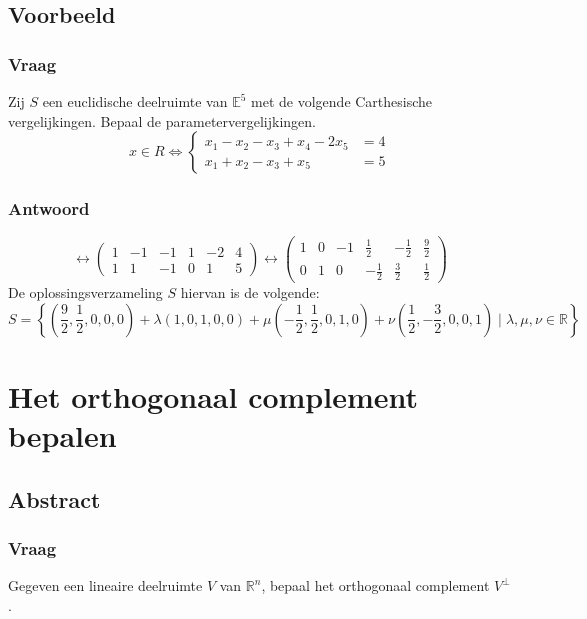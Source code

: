 \documentclass[main.tex]{subfiles}
\begin{document}
\subsection*{Voorbeeld}
\subsubsection*{Vraag}
\begin{center}
  Zij $S$ een euclidische deelruimte van $\mathbb{E}^{5}$ met de
  volgende Carthesische vergelijkingen.  Bepaal de
  parametervergelijkingen.
  \[
  x \in R \Leftrightarrow
  \left\{
    \begin{array}{cc}
      x_{1}-x_{2}-x_{3}+x_{4}-2x_{5}&=4\\
      x_{1} + x_{2} -x_{3} + x_{5} &=5
    \end{array}
  \right.
  \]
\end{center}

\subsubsection*{Antwoord}
\[
  \leftrightarrow
  \left(
    \begin{array}{ccccc|c}
      1 & -1 & -1 & 1 & -2 & 4\\
      1 &  1 & -1 & 0 &  1 & 5
    \end{array}
  \right)
  \leftrightarrow
  \left(
    \begin{array}{ccccc|c}
      1 & 0 & -1 &  \frac{1}{2} & -\frac{1}{2} & \frac{9}{2}\\
      0 & 1 & 0  & -\frac{1}{2} &  \frac{3}{2} & \frac{1}{2}
    \end{array}
  \right)
\]
De oplossingsverzameling $S$ hiervan is de volgende:
\[
S = 
\left\{
  \left( \frac{9}{2}, \frac{1}{2}, 0, 0 ,0 \right) + \lambda \left( 1,0,1,0,0 \right) + \mu \left( -\frac{1}{2}, \frac{1}{2},0,1,0\right) + \nu \left( \frac{1}{2},-\frac{3}{2},0,0,1\right) 
  \mid \lambda,\mu,\nu \in \mathbb{R}
\right\}
\]



\newpage
\section{Het orthogonaal complement bepalen}
\label{sec:orthogonaal-complement-bepalen}
\subsection*{Abstract}
\subsubsection*{Vraag}
\begin{center}
  Gegeven een lineaire deelruimte $V$ van $\mathbb{R}^{n}$, bepaal het orthogonaal complement $V^{\bot}$.
\end{center}
\end{document}
